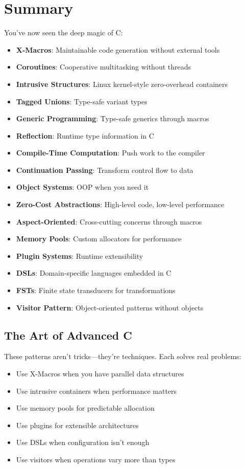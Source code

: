 \section{Summary}

You've now seen the deep magic of C:

\begin{itemize}
    \item \textbf{X-Macros}: Maintainable code generation without external tools
    \item \textbf{Coroutines}: Cooperative multitasking without threads
    \item \textbf{Intrusive Structures}: Linux kernel-style zero-overhead containers
    \item \textbf{Tagged Unions}: Type-safe variant types
    \item \textbf{Generic Programming}: Type-safe generics through macros
    \item \textbf{Reflection}: Runtime type information in C
    \item \textbf{Compile-Time Computation}: Push work to the compiler
    \item \textbf{Continuation Passing}: Transform control flow to data
    \item \textbf{Object Systems}: OOP when you need it
    \item \textbf{Zero-Cost Abstractions}: High-level code, low-level performance
    \item \textbf{Aspect-Oriented}: Cross-cutting concerns through macros
    \item \textbf{Memory Pools}: Custom allocators for performance
    \item \textbf{Plugin Systems}: Runtime extensibility
    \item \textbf{DSLs}: Domain-specific languages embedded in C
    \item \textbf{FSTs}: Finite state transducers for transformations
    \item \textbf{Visitor Pattern}: Object-oriented patterns without objects
\end{itemize}

\subsection{The Art of Advanced C}

These patterns aren't tricks---they're techniques. Each solves real problems:

\begin{itemize}
    \item Use X-Macros when you have parallel data structures
    \item Use intrusive containers when performance matters
    \item Use memory pools for predictable allocation
    \item Use plugins for extensible architectures
    \item Use DSLs when configuration isn't enough
    \item Use visitors when operations vary more than types
\end{itemize}

